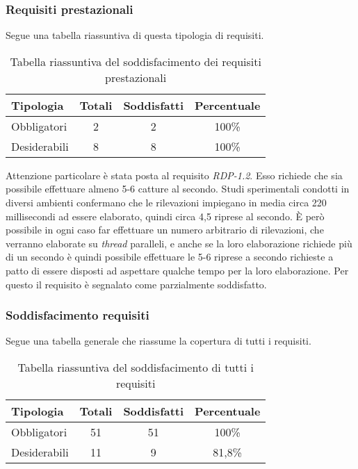 \subsubsection{Requisiti prestazionali}
Segue una tabella riassuntiva di questa tipologia di requisiti.
\begin{table}[H]
	\begin{center}
	  \begin{tabular}{ l  c  c  c }
	    \hline
	    \textbf{Tipologia} & \textbf{Totali} & \textbf{Soddisfatti} & \textbf{Percentuale} \\ \hline
	    Obbligatori & 2 & 2 & 100\%\\ \hline
	    Desiderabili & 8 & 8 & 100\%\\
	    \hline
	  \end{tabular}
	\end{center}
\caption{Tabella riassuntiva del soddisfacimento dei requisiti prestazionali}
\end{table}	
Attenzione particolare è stata posta al requisito \emph{RDP-1.2}. Esso richiede che sia possibile effettuare almeno 5-6 catture al secondo. Studi sperimentali condotti in diversi ambienti confermano che le rilevazioni impiegano in media circa 220 millisecondi ad essere elaborato, quindi circa 4,5 riprese al secondo. È però possibile in ogni caso far effettuare un numero arbitrario di rilevazioni, che verranno elaborate su \emph{thread} paralleli, e anche se la loro elaborazione richiede più di un secondo è quindi possibile effettuare le 5-6 riprese a secondo richieste a patto di essere disposti ad aspettare qualche tempo per la loro elaborazione. Per questo il requisito è segnalato come parzialmente soddisfatto.


\subsubsection{Soddisfacimento requisiti}
Segue una tabella generale che riassume la copertura di tutti i requisiti.
\begin{table}[H]
	\begin{center}
	  \begin{tabular}{ l  c  c  c }
	    \hline
	    \textbf{Tipologia} & \textbf{Totali} & \textbf{Soddisfatti} & \textbf{Percentuale} \\ \hline
	    Obbligatori & 51 & 51 & 100\%\\ \hline
	    Desiderabili & 11 & 9 & 81,8\%\\
	    \hline
	  \end{tabular}
	\end{center}
\caption{Tabella riassuntiva del soddisfacimento di tutti i requisiti}
\end{table}	
